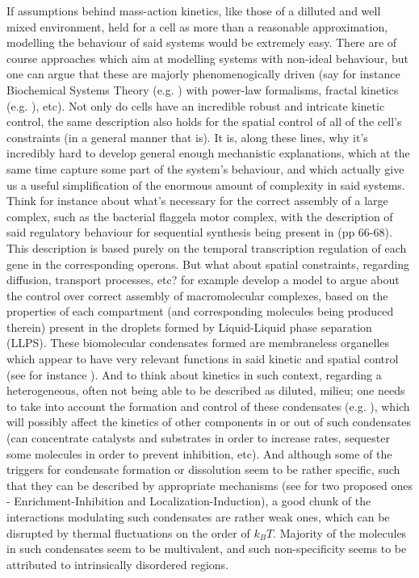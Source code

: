 \documentclass[a4paper,12pt,twoside,leqno]{article}
\begin{document}
If assumptions behind mass-action kinetics, like those of a dilluted and well mixed environment, held for a cell as more than a  reasonable approximation, modelling the behaviour of said systems would be extremely easy. There are of course approaches which aim at modelling systems with non-ideal behaviour, but one can argue that these are majorly phenomenogically driven (say for instance Biochemical Systems Theory (e.g. \cite{voit2013biochemical}) with power-law formalisms, fractal kinetics (e.g. \cite{kopelman1988fractal}), etc). Not only do cells have an incredible robust and intricate kinetic control, the same description also holds for the spatial control of all of the cell's constraints (in a general manner that is). It is, along these lines, why it's incredibly hard to develop general enough mechanistic explanations, which at the same time capture some part of the system's behaviour, and which actually give us a useful simplification of the enormous amount of complexity in said systems. \\
Think for instance about what's necessary for the correct assembly of a large complex, such as the bacterial flaggela motor complex, with the description of said regulatory behaviour for sequential synthesis being present in \cite{alon2019introduction}(pp 66-68). This description is based purely on the temporal transcription regulation of each gene in the corresponding operons. But what about spatial constraints, regarding diffusion, transport processes, etc? \cite{harmon2022molecular} for example develop a model to argue about the control over correct assembly of macromolecular complexes, based on the properties of each compartment (and corresponding molecules being produced therein) present in the droplets formed by Liquid-Liquid phase separation (LLPS). These biomolecular condensates formed are membraneless organelles which appear to have very relevant functions in said kinetic and spatial control (see for instance \cite{lyon2021framework, banani2017biomolecular, holehouse2025molecular}). And to think about kinetics in such context, regarding a heterogeneous, often not being able to be described as diluted, milieu; one needs to take into account the formation and control of these condensates (e.g. \cite{kirschbaum2022chemical}), which will possibly affect the kinetics of other components in or out of such condensates (can concentrate catalysts and substrates in order to increase rates, sequester some molecules in order to prevent inhibition, etc). And although some of the triggers for condensate formation or dissolution seem to be rather specific, such that they can be described by appropriate mechanisms (see \cite{soding2020mechanisms} for two proposed ones - Enrichment-Inhibition and  Localization-Induction), a good chunk of the interactions modulating such condensates are rather weak ones, which can be disrupted by thermal fluctuations on the order of $k_{B}T$. Majority of the molecules in such condensates seem to be multivalent, and such non-specificity seems to be attributed to intrinsically disordered regions.\\
\end{document}
